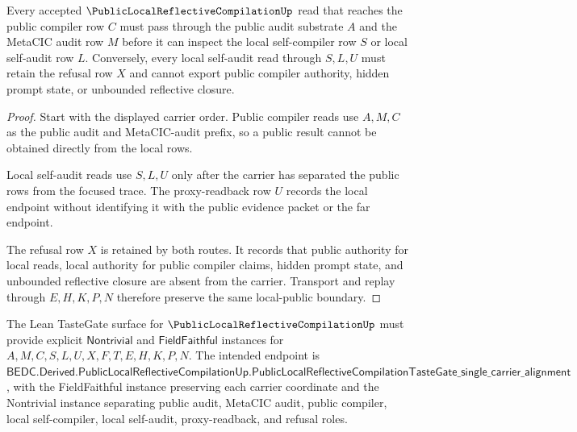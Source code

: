 \begin{theorem}
\label{thm:public-local-reflective-compilation-local-public-boundary}
Every accepted $\PublicLocalReflectiveCompilationUp$ read that reaches the public compiler row $C$ must pass through the public audit substrate $A$ and the MetaCIC audit row $M$ before it can inspect the local self-compiler row $S$ or local self-audit row $L$. Conversely, every local self-audit read through $S,L,U$ must retain the refusal row $X$ and cannot export public compiler authority, hidden prompt state, or unbounded reflective closure.
\end{theorem}
\begin{proof}
Start with the displayed carrier order. Public compiler reads use $A,M,C$ as the public audit and MetaCIC-audit prefix, so a public result cannot be obtained directly from the local rows.

Local self-audit reads use $S,L,U$ only after the carrier has separated the public rows from the focused trace. The proxy-readback row $U$ records the local endpoint without identifying it with the public evidence packet or the far endpoint.

The refusal row $X$ is retained by both routes. It records that public authority for local reads, local authority for public compiler claims, hidden prompt state, and unbounded reflective closure are absent from the carrier. Transport and replay through $E,H,K,P,N$ therefore preserve the same local-public boundary.
\end{proof}



The Lean TasteGate surface for $\PublicLocalReflectiveCompilationUp$ must provide explicit $\mathsf{Nontrivial}$ and $\mathsf{FieldFaithful}$ instances for $A,M,C,S,L,U,X,F,T,E,H,K,P,N$. The intended endpoint is $\mathsf{BEDC.Derived.PublicLocalReflectiveCompilationUp.PublicLocalReflectiveCompilationTasteGate\_single\_carrier\_alignment}$, with the FieldFaithful instance preserving each carrier coordinate and the Nontrivial instance separating public audit, MetaCIC audit, public compiler, local self-compiler, local self-audit, proxy-readback, and refusal roles.

